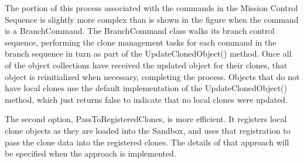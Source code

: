 \documentclass[10pt,letterpaper]{article}
\begin{document}
\noindent The portion of this process associated with the commands in the Mission Control Sequence is slightly more complex than is shown in the figure when the command is a BranchCommand.  The BranchCommand class walks its branch control sequence, performing the clone management tasks for each command in the branch sequence in turn as part of the UpdateClonedObject() method.  Once all of the object collections have received the updated object for their clones, that object is reinitialized when necessary, completing the process.  Objects that do not have local clones use the default implementation of the UpdateClonedObject() method, which just returns false to indicate that no local clones were updated.

The second option, PassToRegisteredClones, is more efficient.  It registers local clone objects as they are loaded into the Sandbox, and uses that registration to pass the clone data into the registered clones.  The details of that approach will be specified when the approach is implemented. 
\end{document}

